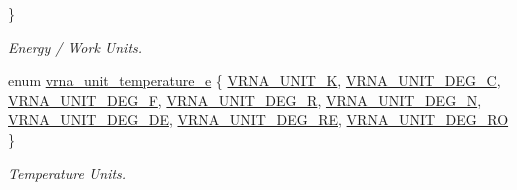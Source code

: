 \begin{DoxyCompactItemize}
 \}
\begin{DoxyCompactList}\small\item\em Energy / Work Units. \end{DoxyCompactList}\item 
enum \mbox{\hyperlink{group__units_gadeca8d9e91ef85f1b652cc8aef63d7e4}{vrna\+\_\+unit\+\_\+temperature\+\_\+e}} \{ \newline
\mbox{\hyperlink{group__units_ggadeca8d9e91ef85f1b652cc8aef63d7e4a9b970a8dd20a98af000ac43e393a1d2d}{V\+R\+N\+A\+\_\+\+U\+N\+I\+T\+\_\+K}}, 
\mbox{\hyperlink{group__units_ggadeca8d9e91ef85f1b652cc8aef63d7e4a64b03f220d7256def88b3ed4a78440b2}{V\+R\+N\+A\+\_\+\+U\+N\+I\+T\+\_\+\+D\+E\+G\+\_\+C}}, 
\mbox{\hyperlink{group__units_ggadeca8d9e91ef85f1b652cc8aef63d7e4a56a659dc1a1e6c01a62c67ed8799fea9}{V\+R\+N\+A\+\_\+\+U\+N\+I\+T\+\_\+\+D\+E\+G\+\_\+F}}, 
\mbox{\hyperlink{group__units_ggadeca8d9e91ef85f1b652cc8aef63d7e4a71335b199e50c9ac773d4090018984bc}{V\+R\+N\+A\+\_\+\+U\+N\+I\+T\+\_\+\+D\+E\+G\+\_\+R}}, 
\newline
\mbox{\hyperlink{group__units_ggadeca8d9e91ef85f1b652cc8aef63d7e4ac3c83c399df537d213671bf6537bd400}{V\+R\+N\+A\+\_\+\+U\+N\+I\+T\+\_\+\+D\+E\+G\+\_\+N}}, 
\mbox{\hyperlink{group__units_ggadeca8d9e91ef85f1b652cc8aef63d7e4a8b047fe5980c99270a587e668c2a2d8b}{V\+R\+N\+A\+\_\+\+U\+N\+I\+T\+\_\+\+D\+E\+G\+\_\+\+DE}}, 
\mbox{\hyperlink{group__units_ggadeca8d9e91ef85f1b652cc8aef63d7e4a94dce0a5f2e13a3a3fd554d6b0cd6395}{V\+R\+N\+A\+\_\+\+U\+N\+I\+T\+\_\+\+D\+E\+G\+\_\+\+RE}}, 
\mbox{\hyperlink{group__units_ggadeca8d9e91ef85f1b652cc8aef63d7e4a405589efa7e654a6cfe148a992adc1d0}{V\+R\+N\+A\+\_\+\+U\+N\+I\+T\+\_\+\+D\+E\+G\+\_\+\+RO}}
 \}
\begin{DoxyCompactList}\small\item\em Temperature Units. \end{DoxyCompactList}\end{DoxyCompactItemize}
